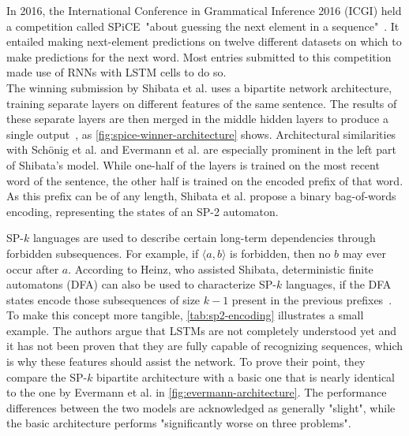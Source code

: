 In 2016, the International Conference in Grammatical Inference 2016 (ICGI) held a competition called SPiCE\ "about guessing the next element in a sequence"~\cite{web:spice}. It entailed making next-element predictions on twelve different datasets on which to make predictions for the next word. Most entries submitted to this competition made use of RNNs with LSTM cells to do so.\\

The winning submission by Shibata et al. uses a bipartite network architecture, training separate layers on different features of the same sentence. The results of these separate layers are then merged in the middle hidden layers to produce a single output~\cite{shibata2016bipartite}, as \autoref{fig:spice-winner-architecture} shows. Architectural similarities with Schönig et al. and Evermann et al. are especially prominent in the left part of Shibata's model.
While one-half of the layers is trained on the most recent word of the sentence, the other half is trained on the encoded prefix of that word. As this prefix can be of any length, Shibata et al. propose a binary bag-of-words encoding, representing the states of an SP-2 automaton.

SP-$k$ languages are used to describe certain long-term dependencies through forbidden subsequences. For example, if $\langle a,b \rangle$ is forbidden, then no $b$ may ever occur after $a$. According to Heinz, who assisted Shibata, deterministic finite automatons (DFA) can also be used to characterize SP-$k$ languages, if the DFA states encode those subsequences of size $k-1$ present in the previous prefixes~\cite{heinz2010estimatingSP}. To make this concept more tangible, \autoref{tab:sp2-encoding} illustrates a small example. The authors argue that LSTMs are not completely understood yet and it has not been proven that they are fully capable of recognizing sequences, which is why these features should assist the network. To prove their point, they compare the SP-$k$ bipartite architecture with a basic one that is nearly identical to the one by Evermann et al. in \autoref{fig:evermann-architecture}. The performance differences between the two models are acknowledged as generally "slight", while the basic architecture performs "significantly worse on three problems".

